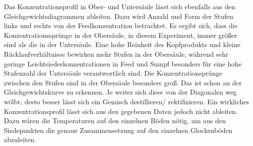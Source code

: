 \begin{table}[h!]
	\centering
	\caption{Vergleich der Ergebnisse aus händischer Berechnung zu den Ergebnissen des Programms VLE}
	\label{tab:Vergleich}
\end{table}
\FloatBarrier
\vspace*{-2.5mm}
Das Konzentrationsprofil in Ober- und Untersäule lässt sich ebenfalls aus den Gleichgewichtsdiagrammen ableiten. Dazu wird Anzahl und Form der Stufen links und rechts von der Feedkonzentration betrachtet. Es ergibt sich, dass die Konzentrationssprünge in der Obersäule, in diesem Experiment, immer größer sind als die in der Untersäule. Eine hohe Reinheit des Kopfprodukts und kleine Rücklaufverhältnisse bewirken mehr Stufen in der Obersäule, während sehr geringe Leichtsiederkonzentrationen in Feed und Sumpf besonders für eine hohe Stufenzahl der Untersäule verantwortlich sind. Die Konzentrationsprünge zwischen den Stufen sind in der Obersäule besonders groß. Das ist schon an der Gleichgewichtskurve zu erkennen. Je weiter sich diese von der Diagonalen weg wölbt, desto besser lässt sich ein Gemisch destillieren/ rektifizieren. Ein wirkliches Konzentrationsprofil lässt sich aus den gegebenen Daten jedoch nicht ableiten. Dazu wären die Temperaturen auf den einzelnen Böden nötig, um aus den Siedepunkten die genaue Zusammensetzung auf den einzelnen Glockenböden abzuleiten.


